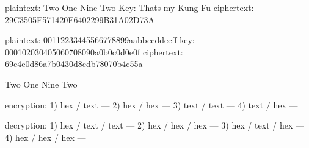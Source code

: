 plaintext: Two One Nine Two
Key: Thats my Kung Fu
ciphertext: 29C3505F571420F6402299B31A02D73A

plaintext: 00112233445566778899aabbccddeeff
key: 000102030405060708090a0b0c0d0e0f
ciphertext: 69c4e0d86a7b0430d8cdb78070b4c55a

Two One Nine Two

encryption:
1) hex / text ---
2) hex / hex ---
3) text / text ---
4) text / hex ---

decryption:
1) hex / text / text ---
2) hex / hex / hex ---
3) hex / text / hex ---
4) hex / hex / hex ---